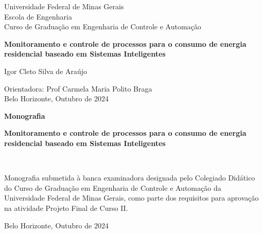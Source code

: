 \begin{titlepage}
\begin{center}
{\large Universidade Federal de Minas Gerais\\
Escola de Engenharia \\
Curso de Graduação em Engenharia de Controle e Automação\\
}

\vspace{6cm}
\parbox{\textwidth}{\centering\bf\Large Monitoramento e controle de processos para o consumo de energia residencial baseado em Sistemas Inteligentes\vspace{0.2cm}}

\vspace{4cm}

{\large Igor Cleto Silva de Araújo}
\vspace{2cm}  
   
\vspace{2cm}          
{\large Orientadora: Prof Carmela Maria Polito Braga}\\

\vfill
{\large Belo Horizonte, Outubro de 2024 }
\end{center}

\end{titlepage}

\newpage
\clearpage
\thispagestyle{empty}


\begin{titlepage}

\centering
\textbf{Monografia}\\
\vspace{2cm}
\centering
\parbox{\textwidth}{\centering\bf\Large Monitoramento e controle de processos para o consumo de energia residencial baseado em Sistemas Inteligentes}\\
\vspace{5cm} 

\parbox{1.0\textwidth} 
{\large 
Monografia submetida à banca examinadora
designada pelo Colegiado Didático do Curso de
Graduação em Engenharia de Controle e
Automação da Universidade Federal de Minas
Gerais, como parte dos requisitos para aprovação na
atividade Projeto Final de Curso II.}

\vspace{7cm} 
\centering
Belo Horizonte, Outubro de 2024

\end{titlepage}
